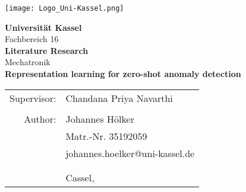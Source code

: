 \vspace{20pt}
\texttt{[image: Logo\_Uni-Kassel.png]}\vspace{50pt}
\begin{center}
\large\textbf{Universität Kassel}\\
Fachbereich 16\\
\Large\textbf{Literature Research}\\
\large Mechatronik\\\vspace{50pt}
\Large\textbf{Representation learning for zero-shot anomaly detection}\\
\vspace{120pt}
\large
\begin{tabular}{rl}
Supervisor: & Chandana Priya Navarthi\\
  & \\
Author: & Johannes Hölker\\
 & Matr.-Nr. 35192059\\
 & johannes.hoelker@uni-kassel.de\\\vspace{40pt}
 & \\
 & \\
 & Cassel, \\
\end{tabular}
\end{center}
\thispagestyle{empty}
